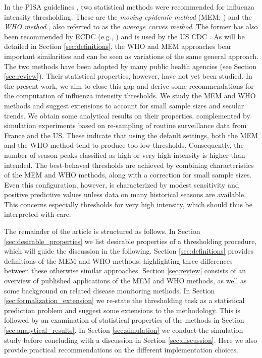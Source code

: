 \documentclass[12pt]{article}
\begin{document}
In the PISA guidelines \citep{WHO2017}, two statistical methods were recommended for influenza intensity thresholding. These are the \textit{moving epidemic method} (MEM; \citealt{Vega2015}) and the \textit{WHO method} \citep{WHO2014}, also referred to as the \textit{average curves method}. The former has also been recommended by ECDC (e.g., \citealt{ECDC2017}) and is used by the US CDC \citep{Biggerstaff2017}. As will be detailed in Section \ref{sec:definitions}, the WHO and MEM approaches bear important similarities and can be seen as variations of the same general approach. The two methods have been adopted by many public health agencies (see Section \ref{sec:review}). Their statistical properties, however, have not yet been studied. In the present work, we aim to close this gap and derive some recommendations for the computation of influenza intensity thresholds. We study the MEM and WHO methods and suggest extensions to account for small sample sizes and secular trends. We obtain some analytical results on their properties, complemented by simulation experiments based on re-sampling of routine surveillance data from France and the US. These indicate that using the default settings, both the MEM and the WHO method tend to produce too low thresholds. Consequently, the number of season peaks classified as high or very high intensity is higher than intended. The best-behaved thresholds are achieved by combining characteristics of the MEM and WHO methods, along with a correction for small sample sizes. Even this configuration, however, is characterized by modest sensitivity and positive predictive values unless data on many historical seasons are available. This concerns especially thresholds for very high intensity, which should thus be interpreted with care.

The remainder of the article is structured as follows. In Section \ref{sec:desirable_properties} we list desirable properties of a thresholding procedure, which will guide the discussion in the following. Section \ref{sec:definitions} provides definitions of the MEM and WHO methods, highlighting three differences between these otherwise similar approaches. Section \ref{sec:review} consists of an overview of published applications of the MEM and WHO methods, as well as some background on related disease monitoring methods. In Section \ref{sec:formalization_extension} we re-state the thresholding task as a statistical prediction problem and suggest some extensions to the methodology. This is followed by an examination of statistical properties of the methods in Section \ref{sec:analytical_results}. In Section \ref{sec:simulation} we conduct the simulation study before concluding with a discussion in Section \ref{sec:discussion}. Here we also provide practical recommendations on the different implementation choices.
\end{document}
